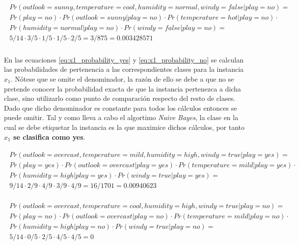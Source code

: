 \documentclass{article}
\begin{document}
		\begin{align}
		\label{eq:x1_probability_no}
			\begin{split}
			Pr(outlook = sunny, temperature = cool, humidity = normal, windy = false | play = no) = \\
			Pr(play = no) \cdot Pr(outlook = sunny | play = no) \cdot Pr(temperature = hot 	| play = no) \cdot \\
			Pr(humidity = normal 	| play = no) \cdot Pr(windy = false | play = no) =\\
			 5/14 \cdot 3/5 \cdot 1/5 \cdot 1/5 \cdot  2/5 = 3/875 = 0.003428571
		 \end{split}
		\end{align}

		\paragraph{}
		En las ecuaciones \eqref{eq:x1_probability_yes} y \eqref{eq:x1_probability_no} se calculan las probabilidades de pertenencia a las correspondientes clases para la instancia $x_1$. Nótese que se omite el denominador, la razón de ello se debe a que no se pretende conocer la probabilidad exacta de que la instancia pertenezca a dicha clase, sino utilizarlo como punto de comparación respecto del resto de clases. Dado que dicho denominador es constante para todos los cálculos entonces se puede omitir. Tal y como lleva a cabo el algortimo \emph{Naive Bayes}, la clase en la cual se debe etiquetar la instancia es la que maximice dichos cálculos, por tanto \textbf{$x_1$ se clasifica como yes}.

		\begin{align}
		\label{eq:x2_probability_yes}
			\begin{split}
				Pr(outlook = overcast, temperature = mild, humidity = high, windy = true | play = yes) = \\
				Pr(play = yes) \cdot Pr(outlook = overcast | play = yes) \cdot Pr(temperature = mild | play = yes) \cdot \\
				Pr(humidity = high 	| play = yes) \cdot Pr(windy = true 	| play = yes) = \\
				9/14 \cdot 2/9 \cdot 4/9 \cdot 3/9 \cdot 4/9 = 16/1701 = 0.00940623
			\end{split}
		\end{align}

		\begin{align}
		\label{eq:x2_probability_no}
			\begin{split}
				Pr(outlook = overcast, temperature = cool, humidity = high, windy = true | play = no) = \\
				Pr(play = no) \cdot Pr(outlook = overcast | play = no) \cdot Pr(temperature = mild | play = no) \cdot \\
				Pr(humidity = high 	| play = no) \cdot Pr(windy = true | play = no) =\\
				5/14 \cdot 0/5 \cdot 2/5 \cdot 4/5 \cdot  4/5 = 0
			\end{split}
		\end{align}
\end{document}
